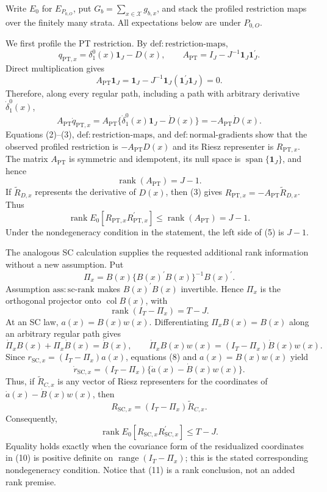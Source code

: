 Write \(E_0\) for \(E_{P_{0,O}}\), put \(G_b=\sum_{x\in\mathcal X}g_{b,x}\), and stack the profiled restriction maps over the finitely many strata. All expectations below are under \(P_{0,O}\).

We first profile the PT restriction. By \(\mathrm{def{:}restriction\text{-}maps}\),
\[
 q_{\mathrm{PT},x}=\delta_1^0(x)\mathbf 1_J-D(x),
 \qquad
 A_{\mathrm{PT}}=I_J-J^{-1}\mathbf 1_J\mathbf 1_J^{\prime}.
 \tag{1}
\]
Direct multiplication gives
\[
 A_{\mathrm{PT}}\mathbf 1_J
 =\mathbf 1_J-J^{-1}\mathbf 1_J(\mathbf 1_J^{\prime}\mathbf 1_J)
 =0.
 \tag{2}
\]
Therefore, along every regular path, including a path with arbitrary derivative \(\dot\delta_1^0(x)\),
\[
 A_{\mathrm{PT}}\dot q_{\mathrm{PT},x}
 =A_{\mathrm{PT}}\{\dot\delta_1^0(x)\mathbf 1_J-\dot D(x)\}
 =-A_{\mathrm{PT}}\dot D(x).
 \tag{3}
\]
Equations (2)--(3), \(\mathrm{def{:}restriction\text{-}maps}\), and \(\mathrm{def{:}normal\text{-}gradients}\) show that the observed profiled restriction is \(-A_{\mathrm{PT}}D(x)\) and its Riesz representer is \(R_{\mathrm{PT},x}\). The matrix \(A_{\mathrm{PT}}\) is symmetric and idempotent, its null space is \(\operatorname{span}\{\mathbf 1_J\}\), and hence
\[
 \operatorname{rank}(A_{\mathrm{PT}})=J-1.
 \tag{4}
\]
If \(\widetilde R_{D,x}\) represents the derivative of \(D(x)\), then (3) gives \(R_{\mathrm{PT},x}=-A_{\mathrm{PT}}\widetilde R_{D,x}\). Thus
\[
 \operatorname{rank}E_0[R_{\mathrm{PT},x}R_{\mathrm{PT},x}^{\prime}]
 \le \operatorname{rank}(A_{\mathrm{PT}})=J-1.
 \tag{5}
\]
Under the nondegeneracy condition in the statement, the left side of (5) is \(J-1\).

The analogous SC calculation supplies the requested additional rank information without a new assumption. Put
\[
 \Pi_x=B(x)\{B(x)^{\prime}B(x)\}^{-1}B(x)^{\prime}.
 \tag{6}
\]
Assumption \(\mathrm{ass{:}sc\text{-}rank}\) makes \(B(x)^{\prime}B(x)\) invertible. Hence \(\Pi_x\) is the orthogonal projector onto \(\operatorname{col}B(x)\), with
\[
 \operatorname{rank}(I_T-\Pi_x)=T-J.
 \tag{7}
\]
At an SC law, \(a(x)=B(x)w(x)\). Differentiating \(\Pi_xB(x)=B(x)\) along an arbitrary regular path gives
\[
 \dot\Pi_x B(x)+\Pi_x\dot B(x)=\dot B(x),
 \qquad
 \dot\Pi_x B(x)w(x)=(I_T-\Pi_x)\dot B(x)w(x).
 \tag{8}
\]
Since \(r_{\mathrm{SC},x}=(I_T-\Pi_x)a(x)\), equations (8) and \(a(x)=B(x)w(x)\) yield
\[
 \dot r_{\mathrm{SC},x}
 =(I_T-\Pi_x)\{\dot a(x)-\dot B(x)w(x)\}.
 \tag{9}
\]
Thus, if \(\widetilde R_{C,x}\) is any vector of Riesz representers for the coordinates of \(\dot a(x)-\dot B(x)w(x)\), then
\[
 R_{\mathrm{SC},x}=(I_T-\Pi_x)\widetilde R_{C,x}.
 \tag{10}
\]
Consequently,
\[
 \operatorname{rank}E_0[R_{\mathrm{SC},x}R_{\mathrm{SC},x}^{\prime}]
 \le T-J.
 \tag{11}
\]
Equality holds exactly when the covariance form of the residualized coordinates in (10) is positive definite on \(\operatorname{range}(I_T-\Pi_x)\); this is the stated corresponding nondegeneracy condition. Notice that (11) is a rank conclusion, not an added rank premise.

